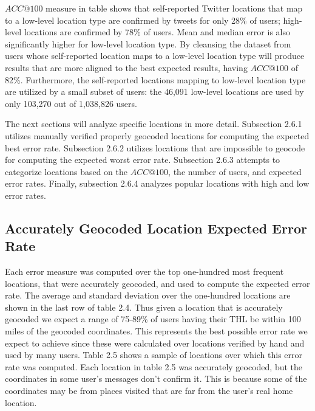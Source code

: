 $ACC@100$ measure in table shows that self-reported Twitter locations that map to a low-level location type are confirmed by tweets for only 28\% of users; high-level locations are confirmed by 78\% of users. Mean and median error is also significantly higher for low-level location type. By cleansing the dataset from users whose self-reported location maps to a low-level location type will produce results that are more aligned to the best expected results, having $ACC@100$ of 82\%. Furthermore, the self-reported locations mapping to low-level location type are utilized by a small subset of users: the 46,091 low-level locations are used by only 103,270 out of 1,038,826 users.

The next sections will analyze specific locations in more detail. Subsection 2.6.1 utilizes manually verified properly geocoded locations for computing the expected best error rate. Subsection 2.6.2 utilizes locations that are impossible to geocode for computing the expected worst error rate. Subsection 2.6.3 attempts to categorize locations based on the $ACC@100$, the number of users, and expected error rates. Finally, subsection 2.6.4 analyzes popular locations with high and low error rates. 

\subsection{Accurately Geocoded Location Expected Error Rate}

Each error measure was computed over the top one-hundred most frequent locations, that were accurately geocoded, and used to compute the expected error rate. The average and standard deviation over the one-hundred locations are shown in the last row of table 2.4. Thus given a location that is accurately geocoded we expect a range of 75-89\% of users having their THL be within 100 miles of the geocoded coordinates. This represents the best possible error rate we expect to achieve since these were calculated over locations verified by hand and used by many users. Table 2.5 shows a sample of locations over which this error rate was computed. Each location in table 2.5 was accurately geocoded, but the coordinates in some user's messages don't confirm it. This is because some of the coordinates may be from places visited that are far from the user's real home location. 

